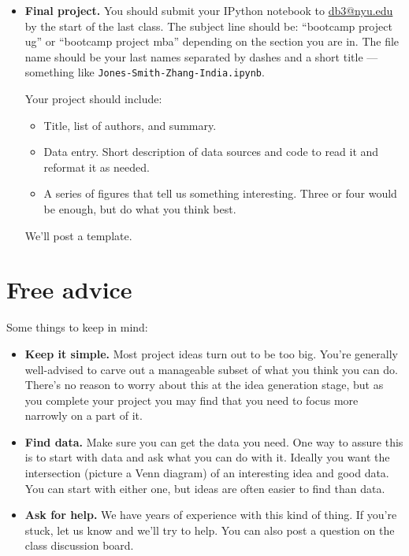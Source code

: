 \documentclass[11pt]{article}
\begin{document}
\begin{itemize}
\item {\bf Final project.}
You should submit your IPython notebook to \href{mailto:db3@nyu.edu}{db3@nyu.edu}
by the start of the last class.
The subject line should be:  ``bootcamp project ug'' or ``bootcamp project mba''
depending on the section you are in.
The file name should be your last names separated by dashes and a short title ---
something like {\tt Jones-Smith-Zhang-India.ipynb}.

Your project should include:
\begin{itemize}
\item Title, list of authors, and summary.
\item Data entry.  Short description of data sources and code to read it
and reformat it as needed.
\item A series of figures that tell us something interesting.
Three or four would be enough, but do what you think best.
\end{itemize}
We'll post a template.
\end{itemize}


\section*{Free advice}

Some things to keep in mind:
%
\begin{itemize}
\item {\bf Keep it simple.}
Most project ideas turn out to be too big.  You're generally well-advised
to carve out a manageable subset of what you think you can do.
There's no reason to worry about this at the idea generation stage,
but as you complete your project you may find that you need to focus
more narrowly on a part of it.

\item {\bf Find data.}  Make sure you can get the data you need.
One way to assure this is to start with data and ask what you can do with it.
Ideally you want the intersection (picture a Venn diagram) of an interesting
idea and good data.  You can start with either one, but ideas are often easier to
find than data.

\item {\bf Ask for help.}
We have years of experience with this kind of thing.
If you're stuck, let us know and we'll try to help.
You can also post a question on the class discussion board.

\end{itemize}




\end{document}
